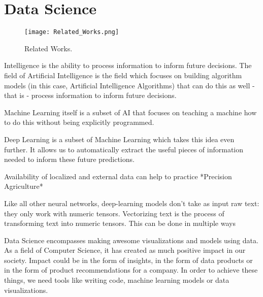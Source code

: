 



\section{Data Science}

\begin{figure}[h!]
	\centering
	\texttt{[image: Related\_Works.png]}
	\caption{Related Works.\protect\cite{tkacz2001neural, chuku2017intelligent, kiss2011significance, yamak2019comparison}}
	\label{fig:relatedWorks}
\end{figure}








Intelligence is the ability to process information to inform future decisions. The field of Artificial Intelligence is the field which focuses on building algorithm models (in this case, Artificial Intelligence \cite{black2009books} Algorithms) that can do this as well - that is - process information to inform future decisions.

Machine Learning itself is a subset of AI that focuses on teaching a machine how to do this without being explicitly programmed. 

Deep Learning is a subset of Machine Learning which takes this idea even further. It allows us to automatically extract the useful pieces of information needed to inform these future predictions.

Availability of localized and external data can help to practice *Precision Agriculture*

Like all other neural networks, deep-learning models don't take as input raw text:
they only work with numeric tensors. Vectorizing text is the process of transforming text
into numeric tensors. This can be done in multiple ways


Data Science encompasses making awesome visualizations and models using data. As a field of Computer Science, it has created as much positive impact in our society. Impact could be in the form of insights, in the form of data products or in the form of product recommendations for a company. In order to achieve these things, we need tools like writing code, machine learning models or data visualizations.


